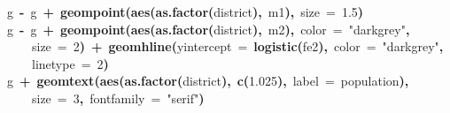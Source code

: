 \documentclass{article}
\makeatletter
\newcommand{\hlnumber}[1]{\textcolor[rgb]{0,0,0}{#1}}%
\newcommand{\hlfunctioncall}[1]{\textcolor[rgb]{.5,0,.33}{\textbf{#1}}}%
\newcommand{\hlstring}[1]{\textcolor[rgb]{.6,.6,1}{#1}}%
\newcommand{\hlkeyword}[1]{\textbf{#1}}%
\newcommand{\hlargument}[1]{\textcolor[rgb]{.69,.25,.02}{#1}}%
\newcommand{\hlassignement}[1]{\textbf{#1}}%
\newcommand{\hlsymbol}[1]{#1}%
\newcommand{\hlstd}[1]{\textcolor[rgb]{0,0,0}{#1}}%
\newenvironment{kframe}{%
 \def\FrameCommand##1{\hskip\@totalleftmargin \hskip-\fboxsep
 \colorbox{shadecolor}{##1}\hskip-\fboxsep
     \hskip-\linewidth \hskip-\@totalleftmargin \hskip\columnwidth}%
 \MakeFramed {\advance\hsize-\width
   \@totalleftmargin\z@ \linewidth\hsize
   \@setminipage}}%
 {\par\unskip\endMakeFramed}
\newenvironment{knitrout}{}{} %
\makeatother
\begin{document}
\begin{knitrout}
{\begin{kframe}
\begin{flushleft}
\hlstd{}\hlsymbol{g}{\ }\hlassignement{\usebox{\hlnormalsizeboxlessthan}-}{\ }\hlsymbol{g}{\ }\hlkeyword{+}{\ }\hlfunctioncall{geom\usebox{\hlnormalsizeboxunderscore}point}\hlkeyword{(}\hlfunctioncall{aes}\hlkeyword{(}\hlfunctioncall{as.factor}\hlkeyword{(}\hlsymbol{district}\hlkeyword{)}\hlkeyword{,}{\ }\hlsymbol{m1}\hlkeyword{)}\hlkeyword{,}{\ }\hlargument{size}{\ }\hlargument{=}{\ }\hlnumber{1.5}\hlkeyword{)}\hspace*{\fill}\\
\hlstd{}\hlsymbol{g}{\ }\hlassignement{\usebox{\hlnormalsizeboxlessthan}-}{\ }\hlsymbol{g}{\ }\hlkeyword{+}{\ }\hlfunctioncall{geom\usebox{\hlnormalsizeboxunderscore}point}\hlkeyword{(}\hlfunctioncall{aes}\hlkeyword{(}\hlfunctioncall{as.factor}\hlkeyword{(}\hlsymbol{district}\hlkeyword{)}\hlkeyword{,}{\ }\hlsymbol{m2}\hlkeyword{)}\hlkeyword{,}{\ }\hlargument{color}{\ }\hlargument{=}{\ }\hlstring{"{}darkgrey"{}}\hlkeyword{,}\hspace*{\fill}\\
\hlstd{}{\ }{\ }{\ }{\ }\hlargument{size}{\ }\hlargument{=}{\ }\hlnumber{2}\hlkeyword{)}{\ }\hlkeyword{+}{\ }\hlfunctioncall{geom\usebox{\hlnormalsizeboxunderscore}hline}\hlkeyword{(}\hlargument{yintercept}{\ }\hlargument{=}{\ }\hlfunctioncall{logistic}\hlkeyword{(}\hlsymbol{fe2}\hlkeyword{)}\hlkeyword{,}{\ }\hlargument{color}{\ }\hlargument{=}{\ }\hlstring{"{}darkgrey"{}}\hlkeyword{,}\hspace*{\fill}\\
\hlstd{}{\ }{\ }{\ }{\ }\hlargument{linetype}{\ }\hlargument{=}{\ }\hlnumber{2}\hlkeyword{)}\hspace*{\fill}\\
\hlstd{}\hlsymbol{g}{\ }\hlkeyword{+}{\ }\hlfunctioncall{geom\usebox{\hlnormalsizeboxunderscore}text}\hlkeyword{(}\hlfunctioncall{aes}\hlkeyword{(}\hlfunctioncall{as.factor}\hlkeyword{(}\hlsymbol{district}\hlkeyword{)}\hlkeyword{,}{\ }\hlfunctioncall{c}\hlkeyword{(}\hlnumber{1.025}\hlkeyword{)}\hlkeyword{,}{\ }\hlargument{label}{\ }\hlargument{=}{\ }\hlsymbol{population}\hlkeyword{)}\hlkeyword{,}\hspace*{\fill}\\
\hlstd{}{\ }{\ }{\ }{\ }\hlargument{size}{\ }\hlargument{=}{\ }\hlnumber{3}\hlkeyword{,}{\ }\hlargument{fontfamily}{\ }\hlargument{=}{\ }\hlstring{"{}serif"{}}\hlkeyword{)}\mbox{}
\normalfont
\end{flushleft}



\end{kframe}}
\end{knitrout}
\end{document}
